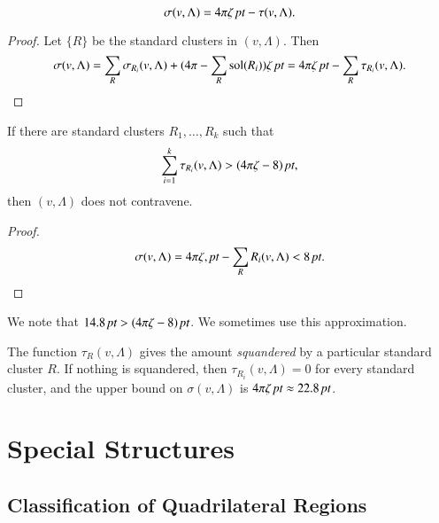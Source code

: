 \begin{lemma}\label{lemma:sigma-tau}
    $$\sigma(v,\Lambda) = {4\pi \zeta\,\hbox{\it pt}} - \tau(v,\Lambda).$$
\end{lemma}

\begin{proof} Let $\{R\}$ be the standard clusters in $(v,\Lambda)$. Then
    $$
    \sigma(v,\Lambda) = \sum_R\sigma_{R_i}(v,\Lambda) +
        (4\pi-\sum_R\operatorname{sol}(R_i))\zeta\,\hbox{\it pt} = 4\pi \zeta\,\hbox{\it pt} - \sum_R\tau_{R_i}(v,\Lambda).
    $$
\end{proof}


\begin{lemma}
If there are standard clusters $R_1,\ldots,R_k$ such that
$$\sum_{i=1}^k \tau_{R_i}(v,\Lambda)> (4\pi\zeta-8)\,\hbox{\it pt},$$
then $(v,\Lambda)$ does not contravene.
\end{lemma}

\begin{proof}
$$\sigma(v,\Lambda) = 4\pi\zeta,\hbox{\it pt} -\sum_R{R_i}(v,\Lambda) < 8\,\hbox{\it pt}.$$
\end{proof}

We note that $14.8\,\hbox{\it pt} > (4\pi\zeta-8)\,\hbox{\it pt}$.  We sometimes use this
approximation.


The function $\tau_R(v,\Lambda)$ gives the amount {\it squandered\/} by a
particular standard cluster $R$.  If nothing is squandered, then
$\tau_{R_i}(v,\Lambda)=0$ for every standard cluster, and the upper bound
on $\sigma(v,\Lambda)$ is
    $4\pi\zeta\,\hbox{\it pt}\approx 22.8\,\hbox{\it pt}$.








\section{Special Structures}

\subsection{Classification of Quadrilateral Regions}
\label{sec:quad-class}


